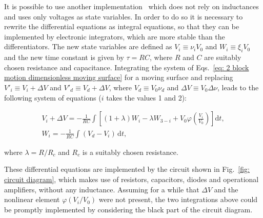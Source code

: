 It is possible to use another implementation~\cite{ref:electronic_analog} which does not rely on inductances
and uses only voltages as state variables. In order to do so it is necessary to rewrite the differential equations
as integral equations, so that they can be implemented by electronic integrators, which are more stable than
the differentiators. The new state variables are defined as $V_i\equiv \nu_i V_0$ and $W_i\equiv \xi_i V_0$ and
the new time constant is given by $\tau=RC$, where $R$ and $C$ are suitably chosen resistance and capacitance.
Integrating the system of Eqs.~\ref{eq: 2 block motion dimensionless moving surface} for a moving surface and replacing
$V'_i\equiv V_i+\Delta V$ and $V'_d\equiv V_d+\Delta V$, where $V_d\equiv V_0\nu_d$ and $\Delta V\equiv V_0\Delta\nu$,
leads to the following system of equations ($i$ takes the values 1 and 2):

\begin{equation}
    \label{eq: 2 block motion electronic}
    \begin{gathered}
        V_i+\Delta V=-\frac{1}{RC}\int\left[ (1+\lambda)W_i - \lambda W_{3-i}+V_0\varphi\left(\frac{V_i}{V_0}\right) \right]\text{d}t ,\\[10pt]
        W_i=-\frac{1}{RC}\int(V_d-V_i)\,\text{d}t,
    \end{gathered}
\end{equation}

where $\lambda=R/R_c$ and $R_c$ is a suitably chosen resistance.

These differential equations are implemented by the circuit shown in Fig.~\ref{fig: circuit diagram},
which makes use of resistors, capacitors, diodes and operational amplifiers, without any inductance.
Assuming for a while that $\Delta V$ and the nonlinear element $\varphi(V_i/V_0)$ were not present,
the two integrations above could be promptly implemented by considering the black part of the circuit diagram.

